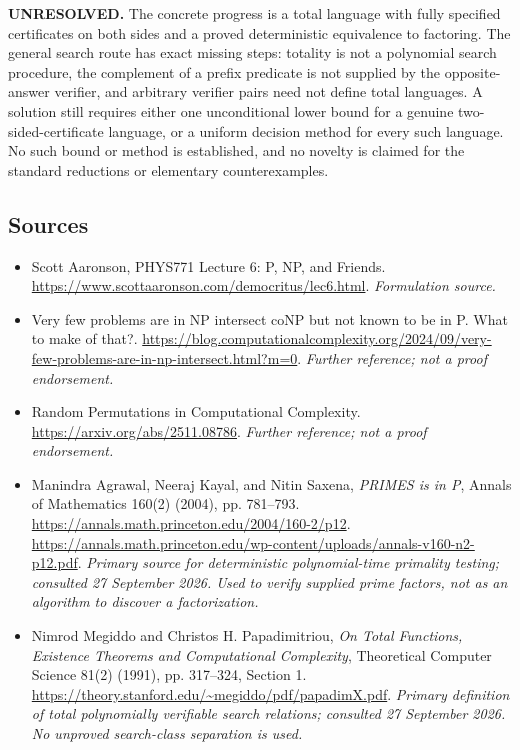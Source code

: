 \documentclass[11pt]{article}
\begin{document}
\textbf{UNRESOLVED.} The concrete progress is a total language with fully
specified certificates on both sides and a proved deterministic equivalence
to factoring. The general search route has exact missing steps: totality
is not a polynomial search procedure, the complement of a prefix predicate
is not supplied by the opposite-answer verifier, and arbitrary verifier
pairs need not define total languages. A solution still requires either
one unconditional lower bound for a genuine two-sided-certificate language,
or a uniform decision method for every such language. No such bound or
method is established, and no novelty is claimed for the standard reductions
or elementary counterexamples.

\subsection{Sources}
\begin{itemize}
\item[S1]Scott Aaronson, PHYS771 Lecture 6: P, NP, and Friends.
\url{https://www.scottaaronson.com/democritus/lec6.html}.
\textit{Formulation source.}
\item[S2]Very few problems are in NP intersect coNP but not known to be in P. What to make of that?.
\url{https://blog.computationalcomplexity.org/2024/09/very-few-problems-are-in-np-intersect.html?m=0}.
\textit{Further reference; not a proof endorsement.}
\item[S3]Random Permutations in Computational Complexity.
\url{https://arxiv.org/abs/2511.08786}.
\textit{Further reference; not a proof endorsement.}
\item[E1]Manindra Agrawal, Neeraj Kayal, and Nitin Saxena,
\emph{PRIMES is in P}, Annals of Mathematics 160(2) (2004), pp. 781--793.
\url{https://annals.math.princeton.edu/2004/160-2/p12}.
\url{https://annals.math.princeton.edu/wp-content/uploads/annals-v160-n2-p12.pdf}.
\textit{Primary source for deterministic polynomial-time primality testing;
consulted 27 September 2026. Used to verify supplied prime factors, not
as an algorithm to discover a factorization.}
\item[E2]Nimrod Megiddo and Christos H. Papadimitriou,
\emph{On Total Functions, Existence Theorems and Computational Complexity},
Theoretical Computer Science 81(2) (1991), pp. 317--324, Section 1.
\url{https://theory.stanford.edu/~megiddo/pdf/papadimX.pdf}.
\textit{Primary definition of total polynomially verifiable search relations;
consulted 27 September 2026. No unproved search-class separation is used.}
\end{itemize}
\end{document}
